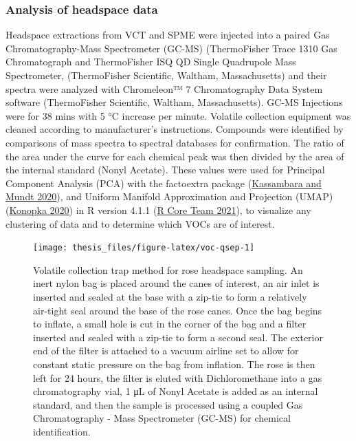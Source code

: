 \documentclass{ufdissertation}[overrideChapters] %
\begin{document}
{\hypertarget{analysis-of-headspace-data}{%
\subsubsection{Analysis of headspace data}\label{analysis-of-headspace-data}}

Headspace extractions from VCT and SPME were injected into a paired Gas Chromatography-Mass Spectrometer (GC-MS) (ThermoFisher Trace 1310 Gas Chromatograph and ThermoFisher ISQ QD Single Quadrupole Mass Spectrometer, (ThermoFisher Scientific, Waltham, Massachusetts) and their spectra were analyzed with Chromeleon™ 7 Chromatography Data System software (ThermoFisher Scientific, Waltham, Massachusetts). GC-MS Injections were for 38 mins with 5 °C increase per minute. Volatile collection equipment was cleaned according to manufacturer's instructions. Compounds were identified by comparisons of mass spectra to spectral databases for confirmation. The ratio of the area under the curve for each chemical peak was then divided by the area of the internal standard (Nonyl Acetate). These values were used for Principal Component Analysis (PCA) with the factoextra package (\protect\hyperlink{ref-Kassambara2020a}{Kassambara and Mundt 2020}), and Uniform Manifold Approximation and Projection (UMAP) (\protect\hyperlink{ref-Konopka2020a}{Konopka 2020}) in R version 4.1.1 (\protect\hyperlink{ref-RCT2021}{R Core Team 2021}), to visualize any clustering of data and to determine which VOCs are of interest.
\begin{figure}

{\centering \texttt{[image: thesis\_files/figure-latex/voc-qsep-1]} 

}

\caption[Volatile collection trap method for rose headspace sampling]{Volatile collection trap method for rose headspace sampling. An inert nylon bag is placed around the canes of interest, an air inlet is inserted and sealed at the base with a zip-tie to form a relatively air-tight seal around the base of the rose canes. Once the bag begins to inflate, a small hole is cut in the corner of the bag and a filter inserted and sealed with a zip-tie to form a second seal. The exterior end of the filter is attached to a vacuum airline set to allow for constant static pressure on the bag from inflation. The rose is then left for 24 hours, the filter is eluted with Dichloromethane into a gas chromatography vial, 1 \si{\micro\liter} of Nonyl Acetate is added as an internal standard, and then the sample is processed using a coupled Gas Chromatography - Mass Spectrometer (GC-MS) for chemical identification.}\label{fig:voc-qsep}
\end{figure}
\begin{figure}


\end{figure}}
\end{document}
